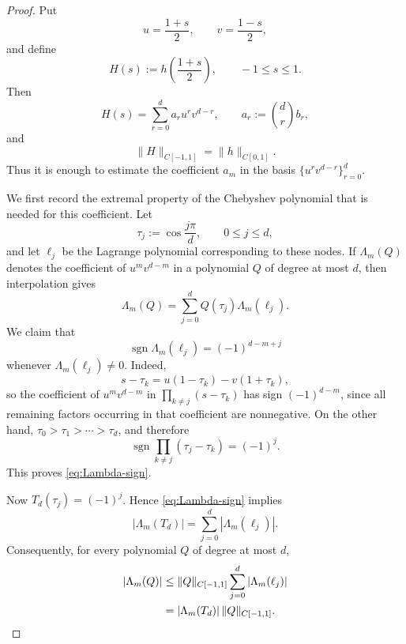 \documentclass[11pt,a4paper]{article}
\numberwithin{equation}{section}
\theoremstyle{cleanplain}
\theoremstyle{cleandefinition}
\theoremstyle{cleanremark}
\begin{document}
{\color{black}
\begin{proof}
Put
\[
 u=\frac{1+s}{2},\qquad v=\frac{1-s}{2},
\]
and define
\[
 H(s):=h\!\left(\frac{1+s}{2}\right),\qquad -1\le s\le1.
\]
Then
\begin{equation}\label{eq:Bernstein-H-basis}
 H(s)=\sum_{r=0}^d a_r u^r v^{d-r},
 \qquad a_r:=\binom dr b_r,
\end{equation}
and
\[
 \|H\|_{C[-1,1]}=\|h\|_{C[0,1]}.
\]
Thus it is enough to estimate the coefficient $a_m$ in the basis
$\{u^r v^{d-r}\}_{r=0}^d$.

We first record the extremal property of the Chebyshev polynomial that is
needed for this coefficient.  Let
\[
 \tau_j:=\cos\frac{j\pi}{d},\qquad 0\le j\le d,
\]
and let $\ell_j$ be the Lagrange polynomial corresponding to these nodes.
If $\Lambda_m(Q)$ denotes the coefficient of $u^m v^{d-m}$ in a polynomial
$Q$ of degree at most $d$, then interpolation gives
\[
 \Lambda_m(Q)=\sum_{j=0}^d Q(\tau_j)\Lambda_m(\ell_j).
\]
We claim that
\begin{equation}\label{eq:Lambda-sign}
 \operatorname{sgn}\Lambda_m(\ell_j)
 =(-1)^{d-m+j}
\end{equation}
whenever $\Lambda_m(\ell_j)\ne0$.  Indeed,
\[
 s-\tau_k=u(1-\tau_k)-v(1+\tau_k),
\]
so the coefficient of $u^m v^{d-m}$ in
$\prod_{k\ne j}(s-\tau_k)$ has sign $(-1)^{d-m}$, since all remaining
factors occurring in that coefficient are nonnegative.  On the other hand,
$\tau_0>\tau_1>\cdots>\tau_d$, and therefore
\[
 \operatorname{sgn}\prod_{k\ne j}(\tau_j-\tau_k)=(-1)^j.
\]
This proves \eqref{eq:Lambda-sign}.

Now $T_d(\tau_j)=(-1)^j$.  Hence \eqref{eq:Lambda-sign} implies
\[
 |\Lambda_m(T_d)|
 =\sum_{j=0}^d |\Lambda_m(\ell_j)|.
\]
Consequently, for every polynomial $Q$ of degree at most $d$,
\begin{align}
 |\Lambda_m(Q)|
 &\le \|Q\|_{C[-1,1]}
       \sum_{j=0}^d |\Lambda_m(\ell_j)| \notag\\
 &=|\Lambda_m(T_d)|\,\|Q\|_{C[-1,1]}.
 \label{eq:Chebyshev-Bernstein-extremal}
\end{align}


\end{proof}}
\end{document}
